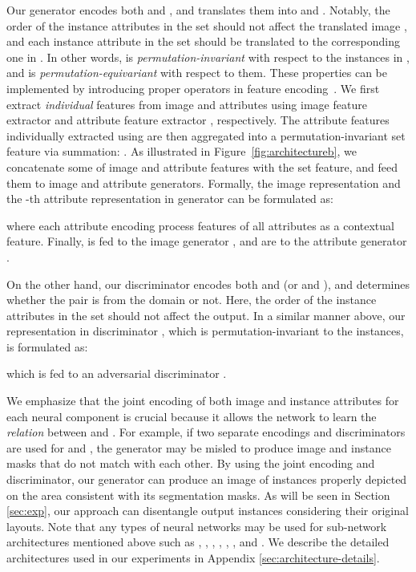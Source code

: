 \documentclass{article} \usepackage{iclr2019_conference,times}
\begin{document}
Our generator  encodes both  and , and translates them into  and .
Notably, the order of the instance attributes in the set  should not affect the translated image , and each instance attribute in the set  should be translated to the corresponding one in . In other words,  is \textit{permutation-invariant} with respect to the instances in , and   is \textit{permutation-equivariant} with respect to them. These properties can be implemented by introducing proper operators in feature encoding~\citep{zaheer2017deep}. 
We first extract \textit{individual} features from image and attributes using image feature extractor  and attribute feature extractor , respectively. The attribute features individually extracted using  are then aggregated into a permutation-invariant set feature via summation: . 
As illustrated in Figure~\ref{fig:architectureb}, we concatenate some of image and attribute features with the set feature, and feed them to image and attribute generators.
{Formally,
the image representation  and the -th attribute representation  in generator  can be formulated as: 
}

where each attribute encoding  process features of all attributes as a contextual feature.  
Finally,  is fed to the image generator , and   are to the attribute generator .


On the other hand, our discriminator  encodes both  and  {(or  and )},
and determines whether the pair is from the domain or not. Here, the order of the instance attributes in the set  should not affect the output. 
In a similar manner above, our representation in discriminator , which is permutation-invariant to the instances, is formulated as:

which is fed to an adversarial discriminator . 

We emphasize that the joint encoding of both image  and instance attributes  
for each neural component is crucial because 
it allows the network to learn the \textit{relation} between  and .
For example, if two separate encodings and discriminators are used for  and ,
the generator may be misled to produce image and instance masks that do not match with each other.
By using the joint encoding and discriminator, our generator can produce an image of
instances properly depicted on the area consistent with its segmentation masks.
As will be seen in Section \ref{sec:exp}, our approach can disentangle output instances considering their original layouts.
Note that any types of neural networks may be used for sub-network architectures mentioned above such as , , , , , , and .
We describe the detailed architectures used in our experiments in Appendix \ref{sec:architecture-details}.
\end{document}
